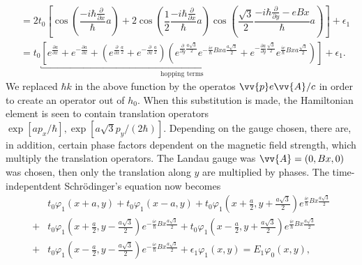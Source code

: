 \documentclass{report}
\newcommand{\f}[2]{\dfrac{#1}{#2}}
\begin{document}
\begin{equation}
\begin{aligned}
		 & = 2t_{0} \left[ \cos\left( \f{-i\hbar \frac{\partial}{\partial x}}{\hbar}a \right) + 2\cos\left( \f{1}{2}\f{-i\hbar\frac{\partial}{\partial x}}{\hbar}a \right) \cos\left( \f{\sqrt{3}}{2}\f{-i\hbar \frac{\partial}{\partial y} - eBx}{\hbar}a \right)  \right] + \epsilon_1                                                                                                                                                                                                     \\
		 & = t_{0} \underbracket{\left[ e^{\frac{\partial a}{\partial x}} + e^{-\frac{\partial a}{\partial x}} +  \left( e^{\frac{\partial}{\partial x} \frac{a}{2}} + e^{-\frac{\partial}{\partial x} \frac{a}{2}} \right) \left( e^{\frac{\partial }{\partial y}\frac{a\sqrt{3}}{2} } e^{-\frac{ie}{\hbar} Bxa\frac{a\sqrt{3}}{2}} + e^{-\frac{\partial a}{\partial y}\frac{\sqrt{3}}{2} } e^{\frac{ie}{\hbar} Bxa\frac{\sqrt{3}}{2}} \right) \right]}_{\text{hopping terms}} + \epsilon_1.
	\end{aligned}
\end{equation}
We replaced $\hbar k$ in the above function by the operatos $\vv{p} e \vv{A} / c$ in order to create an operator out of $h_{0}$. When this substitution is made, the Hamiltonian element is seen to contain translation operators $\exp[a p_{x} / \hbar],\exp[a \sqrt{3} p_{y} / (2\hbar)]$. Depending on the gauge chosen, there are, in addition, certain phase factors dependent on the magnetic field strength, which multiply the translation operators. The Landau gauge was $\vv{A} = (0,Bx,0)$ was chosen, then only the translation  along $y$ are multiplied by phases. \cite{PhysRevB.14.2239}
The time-indepentdent Schr\"{o}dinger's equation now becomes
\begin{equation}
	\begin{aligned}
 		& t_{0} \varphi_{1} (x + a,y) + t_{0}\varphi_{1} (x - a,y) + t_{0}\varphi_{1} (x + \frac{a}{2},y + \frac{a\sqrt{3}}{2}) e^{\frac{ie}{\hbar}Bx \frac{a\sqrt{3}}{2}} \\
		+ & t_{0} \varphi_{1} (x + \frac{a}{2},y - \frac{a\sqrt{3}}{2}) e^{-\frac{ie}{\hbar}Bx \frac{a\sqrt{3}}{2}} + t_{0} \varphi_{1} (x - \frac{a}{2},y + \frac{a\sqrt{3}}{2}) e^{\frac{ie}{\hbar}Bx \frac{a\sqrt{3}}{2}} \\
		+ & t_{0} \varphi_{1} (x - \frac{a}{2},y - \frac{a\sqrt{3}}{2}) e^{-\frac{ie}{\hbar}Bx \frac{a\sqrt{3}}{2}} + \epsilon_{1} \varphi_{1}(x,y) = E_{1} \varphi_{0}(x,y),
	\end{aligned}
\end{equation}
\end{document}
